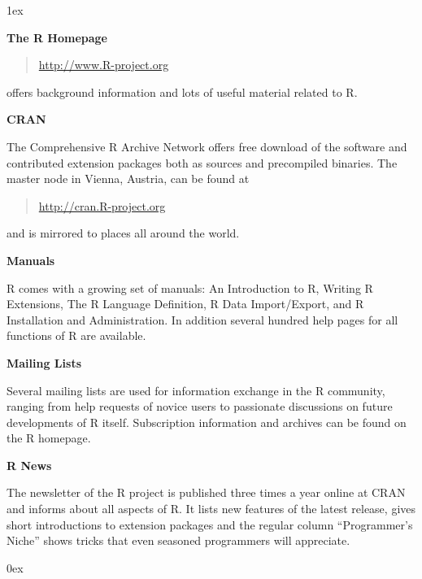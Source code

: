 \documentclass[landscape]{article}
\newlength{\colw}
\newcommand{\column}[1]{\hspace*{9mm}{}
  \parbox[t][0.99\textheight][t]{\colw}{\parskip1ex
    #1\parskip0ex}\hspace{9mm}{}}
\begin{document}
\column{
  \textbf{The R Homepage}
  \begin{quote}
    \url{http://www.R-project.org}
  \end{quote}
  offers background information and lots of useful material related to
  R.

  \textbf{CRAN}

  The Comprehensive R Archive Network offers free download of the
  software and contributed extension packages both as sources and
  precompiled binaries. The master node in Vienna, Austria, can be found at
  \begin{quote}
    \url{http://cran.R-project.org}
  \end{quote}
  and is mirrored to places all around the world.

  \textbf{Manuals}

  R comes with a growing set of manuals: An Introduction to R, Writing R
  Extensions, The R Language Definition, R Data Import/Export, and R
  Installation and Administration. In addition several hundred help
  pages for all functions of R are available.

  \textbf{Mailing Lists}

  Several mailing lists are used for information exchange in the R
  community, ranging from help requests of novice users to passionate
  discussions on future developments of R itself. Subscription
  information and archives can be found on the R homepage.

  \textbf{R News}

  The newsletter of the R project is published three times a year
  online at CRAN and informs about all aspects of R. It lists new
  features of the latest release, gives short introductions to
  extension packages and the regular column ``Programmer's Niche''
  shows tricks that even seasoned programmers will appreciate.

  }
\end{document}
